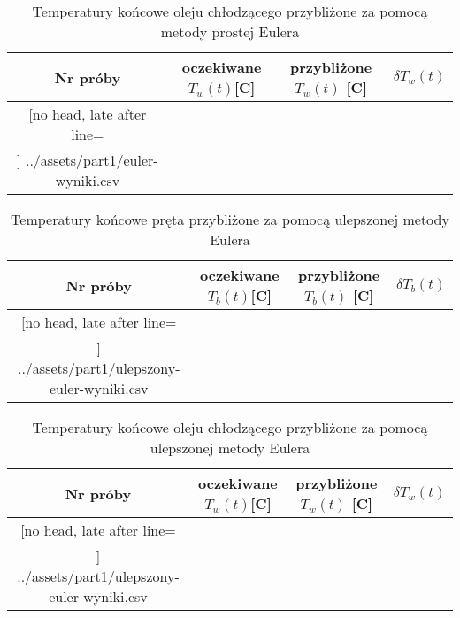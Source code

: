\documentclass[
	12pt, %
]{fphw}
\begin{document}
\begin{table}[H]
	\begin{tabular}{|c|c|c|c|}\hline%
		Nr próby & oczekiwane \(T_w(t)\)[\textdegree{}C] & przybliżone \(T_w(t)\) [\textdegree{}C] & \(\delta T_w(t)\) \\\hline
		\csvreader[no head, late after line=\\\hline]%
		{../assets/part1/euler-wyniki.csv}{}%
		{\thecsvrow&\csvcolii&\csvcolv&\csvcolvi}%
	\end{tabular}
	\caption{Temperatury końcowe oleju chłodzącego przybliżone za pomocą metody prostej Eulera}
	\label{tab:euler-2}
\end{table}

\begin{table}[H]
	\begin{tabular}{|c|c|c|c|}\hline%
		Nr próby & oczekiwane \(T_b(t)\)[\textdegree{}C] & przybliżone \(T_b(t)\) [\textdegree{}C] & \(\delta T_b(t)\) \\\hline
		\csvreader[no head, late after line=\\\hline]%
		{../assets/part1/ulepszony-euler-wyniki.csv}{}%
		{\thecsvrow&\csvcoli&\csvcoliii&\csvcoliv}%
	\end{tabular}
	\caption{Temperatury końcowe pręta przybliżone za pomocą ulepszonej metody Eulera}
	\label{tab:impoved-euler-1}
\end{table}

\begin{table}[H]
	\begin{tabular}{|c|c|c|c|}\hline%
		Nr próby & oczekiwane \(T_w(t)\)[\textdegree{}C] & przybliżone \(T_w(t)\) [\textdegree{}C] & \(\delta T_w(t)\) \\\hline
		\csvreader[no head, late after line=\\\hline]%
		{../assets/part1/ulepszony-euler-wyniki.csv}{}%
		{\thecsvrow&\csvcolii&\csvcolv&\csvcolvi}%
	\end{tabular}
	\caption{Temperatury końcowe oleju chłodzącego przybliżone za pomocą ulepszonej metody Eulera}
	\label{tab:impoved-euler-2}
\end{table}
\end{document}
